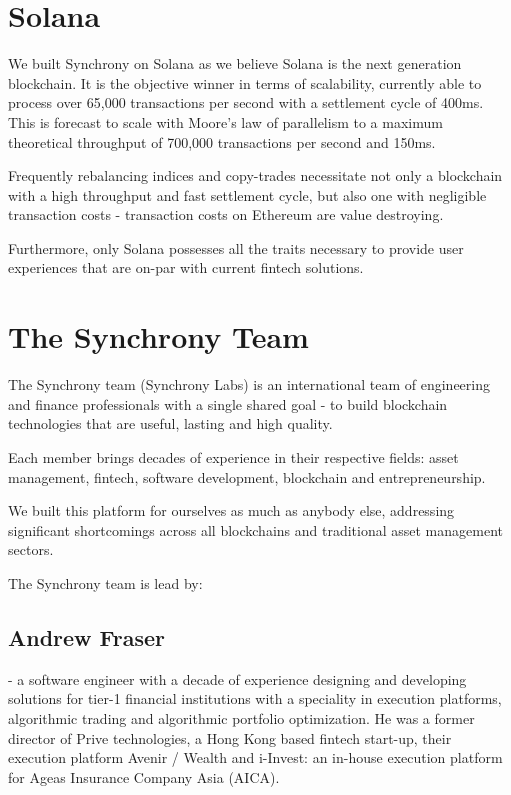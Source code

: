 \documentclass[10pt]{article}
\begin{document}
					\section{Solana}
					We built Synchrony on Solana as we believe Solana is the next generation
					blockchain. It is the objective winner in terms of scalability, currently able
					to process over 65,000 transactions per second with a settlement cycle of 400ms.
					This is forecast to scale with Moore's law of parallelism to a maximum
					theoretical throughput of 700,000 transactions per second and 150ms.

					Frequently rebalancing indices and copy-trades necessitate not only a blockchain
					with a high throughput and fast settlement cycle, but also one with negligible
					transaction costs - transaction costs on Ethereum are value destroying.

					Furthermore, only Solana possesses all the traits necessary to provide user
					experiences that are on-par with current fintech solutions.

					\section{The Synchrony Team}
					The Synchrony team (Synchrony Labs) is an international team of engineering and
					finance professionals with a single shared goal - to build blockchain
					technologies that are useful, lasting and high quality.

					Each member brings decades of experience in their respective fields: asset
					management, fintech, software development, blockchain and entrepreneurship.

					We built this platform for ourselves as much as anybody else, addressing
					significant shortcomings across all blockchains and traditional asset management
					sectors.
					\vspace{1em}

					\noindent The Synchrony team is lead by:
					\subsection{Andrew Fraser} - a software engineer with a decade of experience designing and
					developing solutions for tier-1 financial institutions with a speciality in
					execution platforms, algorithmic trading and algorithmic portfolio optimization.
					He was a former director of Prive technologies, a Hong Kong based fintech
					start-up, their execution platform Avenir / Wealth and i-Invest: an in-house
					execution platform for Ageas Insurance Company Asia (AICA).
\end{document}
